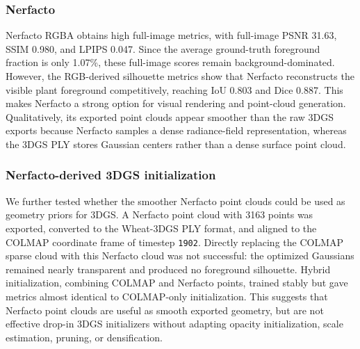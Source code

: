 \documentclass[sigconf]{acmart}
\begin{document}
\subsubsection{Nerfacto} Nerfacto RGBA obtains high full-image metrics, with full-image PSNR 31.63, SSIM 0.980, and LPIPS 0.047. Since the average ground-truth foreground fraction is only 1.07\%, these full-image scores remain background-dominated. However, the RGB-derived silhouette metrics show that Nerfacto reconstructs the visible plant foreground competitively, reaching IoU 0.803 and Dice 0.887. This makes Nerfacto a strong option for visual rendering and point-cloud generation. Qualitatively, its exported point clouds appear smoother than the raw 3DGS exports because Nerfacto samples a dense radiance-field representation, whereas the 3DGS PLY stores Gaussian centers rather than a dense surface point cloud.

\subsubsection{Nerfacto-derived 3DGS initialization}

We further tested whether the smoother Nerfacto point clouds could be used as geometry priors for 3DGS. A Nerfacto point cloud with 3163 points was exported, converted to the Wheat-3DGS PLY format, and aligned to the COLMAP coordinate frame of timestep \texttt{1902}. Directly replacing the COLMAP sparse cloud with this Nerfacto cloud was not successful: the optimized Gaussians remained nearly transparent and produced no foreground silhouette. Hybrid initialization, combining COLMAP and Nerfacto points, trained stably but gave metrics almost identical to COLMAP-only initialization. This suggests that Nerfacto point clouds are useful as smooth exported geometry, but are not effective drop-in 3DGS initializers without adapting opacity initialization, scale estimation, pruning, or densification.
\end{document}
